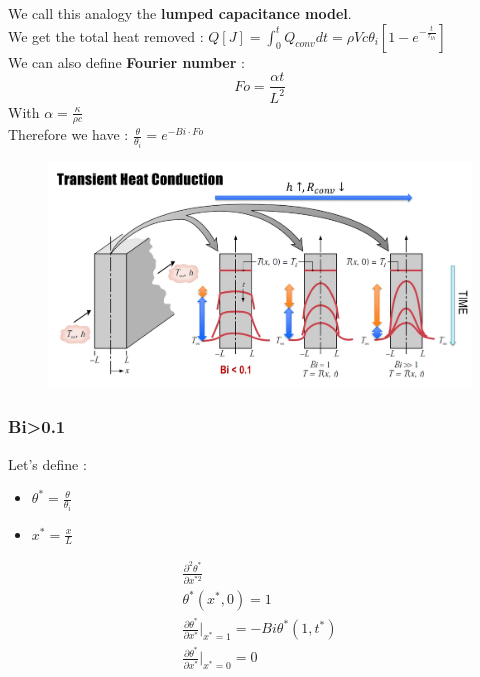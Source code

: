 \documentclass[../main.tex]{subfiles}
\begin{document}
We call this analogy the \textbf{lumped capacitance model}.\\

We get the total heat removed : $Q[J] = \int_0^t Q_{conv} dt = \rho Vc \theta_i [1-e^{-\frac{t}{\tau_{th}}}]$\\

We can also define \textbf{Fourier number} : \begin{equation}
    Fo = \frac{\alpha t}{L^2}
\end{equation}
With $\alpha = \frac{\kappa}{\rho c}$\\

Therefore we have : $\frac{\theta}{\theta_i} = e^{-Bi\cdot Fo}$\\

\begin{figure}[hbt!]
    \centering
    \includegraphics[width = .6\textwidth]{IMAGES/elec/IMG_0165.jpeg}
\end{figure}

\subsubsection{Bi>0.1}

Let's define : \begin{itemize}
    \item $\theta^* = \frac{\theta}{\theta_i}$\\
    \item $x^* = \frac{x}{L}$
\end{itemize}

\begin{equation}
    \begin{gathered}
        \frac{\partial^2 \theta^*}{\partial x^{*2}}\\
        \theta^* (x^*,0)=1\\
        \frac{\partial \theta^*}{\partial x^*}\lvert_{x^* = 1} = -Bi \theta^*(1,t^*)\\
        \frac{\partial \theta^*}{\partial x^*} \lvert_{x^* = 0} = 0\\
    \end{gathered}
\end{equation}
\end{document}
